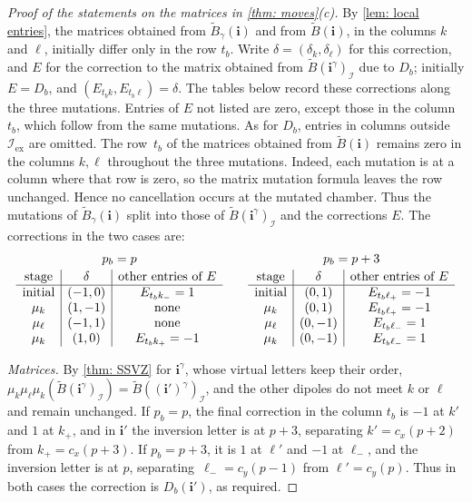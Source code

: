 \documentclass[a4paper]{amsart}
\numberwithin{equation}{section}
\theoremstyle{definition}
\theoremstyle{remark}
\newcommand{\mcI}{\mathcal{I}}
\newcommand{\bfi}{\mathbf{i}}
\newcommand{\tB}{\widetilde{B}}
\newcommand{\ex}{\mathrm{ex}}
\begin{document}
\begin{proof}[Proof of the statements on the matrices in \cref{thm: moves}(c)]
  By \cref{lem: local entries}, the matrices obtained from $\tB_\gamma(\bfi)$ and from $\tB(\bfi)$, in the columns $k$ and $\ell$, initially differ only in the row $t_b$.
  Write $\delta=(\delta_k,\delta_\ell)$ for this correction, and $E$ for the correction to the matrix obtained from $\tB(\bfi^\gamma)_\mcI$ due to $D_b$; initially $E=D_b$, and $(E_{t_bk},E_{t_b\ell})=\delta$.
  The tables below record these corrections along the three mutations.
  Entries of $E$ not listed are zero, except those in the column $t_b$, which follow from the same mutations.
  As for $D_b$, entries in columns outside $\mcI_\ex$ are omitted.
  The row~$t_b$ of the matrices obtained from $\tB(\bfi)$ remains zero in the columns $k,\ell$ throughout the three mutations.
  Indeed, each mutation is at a column where that row is zero, so the matrix mutation formula leaves the row unchanged.
  Hence no cancellation occurs at the mutated chamber.
  Thus the mutations of $\tB_\gamma(\bfi)$ split into those of $\tB(\bfi^\gamma)_\mcI$ and the corrections $E$.
  The corrections in the two cases are:
  \[
    \begin{array}{c|c|c}
      \multicolumn{3}{c}{p_b=p}\\[2pt]
      \text{stage}&\delta&\text{other entries of }E\\ \hline
      \text{initial}&(-1,0)&E_{t_bk_-}=1\\
      \mu_k&(1,-1)&\text{none}\\
      \mu_\ell&(-1,1)&\text{none}\\
      \mu_k&(1,0)&E_{t_bk_+}=-1
    \end{array}
    \qquad
    \begin{array}{c|c|c}
      \multicolumn{3}{c}{p_b=p+3}\\[2pt]
      \text{stage}&\delta&\text{other entries of }E\\ \hline
      \text{initial}&(0,1)&E_{t_b\ell_+}=-1\\
      \mu_k&(0,1)&E_{t_b\ell_+}=-1\\
      \mu_\ell&(0,-1)&E_{t_b\ell_-}=1\\
      \mu_k&(0,-1)&E_{t_b\ell_-}=1
    \end{array}
  \]

  \emph{Matrices.} By \cref{thm: SSVZ} for $\bfi^\gamma$, whose virtual letters keep their order, $\mu_k\mu_\ell\mu_k(\tB(\bfi^\gamma)_\mcI)=\tB((\bfi')^\gamma)_\mcI$, and the other dipoles do not meet $k$ or $\ell$ and remain unchanged.
  If $p_b=p$, the final correction in the column $t_b$ is $-1$ at $k'$ and $1$ at $k_+$, and in $\bfi'$ the inversion letter is at $p+3$, separating $k'=c_x(p+2)$ from $k_+=c_x(p+3)$.
  If $p_b=p+3$, it is $1$ at $\ell'$ and $-1$ at $\ell_-$, and the inversion letter is at $p$, separating~$\ell_-=c_y(p-1)$ from $\ell'=c_y(p)$.
  Thus in both cases the correction is $D_b(\bfi')$, as required.
\end{proof}
\end{document}
